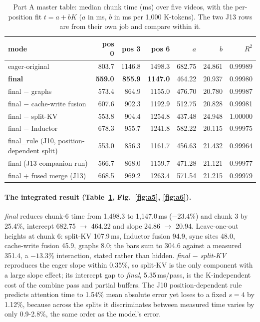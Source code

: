 \documentclass[10pt,a4paper]{article}
\begin{document}
\begin{table}[htbp]\centering\small
\caption{Part A master table: median chunk time (ms) over five videos, with the per-position fit $t=a+bK$ ($a$ in ms, $b$ in ms per 1{,}000 K-tokens). The two J13 rows are from their own job and compare within it.}
\label{tab:master}
\begin{tabular}{lrrrrrr}\toprule
mode & pos 0 & pos 3 & pos 6 & $a$ & $b$ & $R^2$\\\midrule
eager-original & 803.7 & 1146.8 & 1498.3 & 682.75 & 24.861 & 0.99989\\
\textbf{final} & \textbf{559.0} & \textbf{855.9} & \textbf{1147.0} & 464.22 & 20.937 & 0.99980\\
final $-$ graphs & 573.4 & 864.9 & 1155.0 & 476.70 & 20.780 & 0.99987\\
final $-$ cache-write fusion & 607.6 & 902.3 & 1192.9 & 512.75 & 20.828 & 0.99981\\
final $-$ split-KV & 553.8 & 904.4 & 1254.8 & 437.48 & 24.948 & 1.00000\\
final $-$ Inductor & 678.3 & 955.7 & 1241.8 & 582.22 & 20.115 & 0.99975\\
final\_rule (J10, position-dependent split) & 553.0 & 856.3 & 1161.7 & 456.63 & 21.432 & 0.99964\\
final (J13 companion run) & 566.7 & 868.0 & 1159.7 & 471.28 & 21.121 & 0.99977\\
final + fused merge (J13) & 668.5 & 969.2 & 1263.4 & 571.54 & 21.215 & 0.99979\\
\bottomrule\end{tabular}
\end{table}

\paragraph{The integrated result (Table~\ref{tab:master}, Fig.~\ref{fig:a5}, \ref{fig:a6}).} \emph{final} reduces chunk-6 time from 1{,}498.3 to 1{,}147.0\,ms ($-23.4\%$) and chunk 3 by 25.4\%, intercept 682.75 $\to$ 464.22 and slope 24.86 $\to$ 20.94. Leave-one-out heights at chunk 6: split-KV 107.9\,ms, Inductor fusion 94.9, sync sites 48.0, cache-write fusion 45.9, graphs 8.0; the bars sum to 304.6 against a measured 351.4, a $-13.3\%$ interaction, stated rather than hidden. \emph{final $-$ split-KV} reproduces the eager slope within 0.35\%, so split-KV is the only component with a large slope effect; its intercept gap to \emph{final}, 5.35\,ms/pass, is the K-independent cost of the combine pass and partial buffers. The J10 position-dependent rule predicts attention time to 1.54\% mean absolute error yet loses to a fixed $s=4$ by 1.12\%, because across the splits it discriminates between measured time varies by only 0.9-2.8\%, the same order as the model's error.
\end{document}
